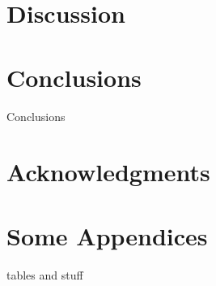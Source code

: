 \documentclass{sig-alternate-05-2015}
\begin{document}
\section{Discussion}

\section{Conclusions}
Conclusions

\section{Acknowledgments}

%

%
%
\appendix
\section{Some Appendices}
tables and stuff
\end{document}
